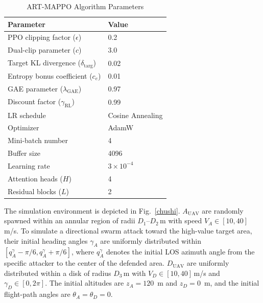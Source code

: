 \documentclass[lettersize,journal]{IEEEtran}
\newcommand{\hladd}[1]{{\color{blue}#1}}
\begin{document}
\begin{table}[t]
\centering
\renewcommand{\arraystretch}{1.4}
\caption{ART-MAPPO Algorithm Parameters}
\label{table2}
\begin{tabular}{ll}
\hline\hline
Parameter & Value \\ \hline
PPO clipping factor ($\epsilon$) & 0.2 \\
Dual-clip parameter ($c$) & 3.0 \\
Target KL divergence ($\delta_{\text{targ}}$) & 0.02 \\
Entropy bonus coefficient ($c_e$) & 0.01 \\
GAE parameter ($\lambda_{\mathrm{GAE}}$) & 0.97 \\
\hladd{Discount factor ($\gamma_{\mathrm{RL}}$)} & \hladd{0.99} \\
LR schedule & Cosine Annealing \\
Optimizer & AdamW \\
Mini-batch number & 4 \\
Buffer size & 4096 \\
Learning rate & $3\times10^{-4}$ \\
Attention heads ($H$) & 4 \\
Residual blocks ($L$) & 2 \\ \hline
\end{tabular}
\end{table}


The simulation environment is depicted in Fig.~\ref{chushi}.
$A_{\text{UAV}}$ are randomly spawned within an annular region of radii $D_1$--$D_2$\,m with speed
$V_A\in[10,40]$\,m/s. To simulate a directional swarm attack toward the high-value target area, their initial heading angles $\gamma_A$ are uniformly distributed within \hladd{$[q_A^{\gamma}-\pi/6,q_A^{\gamma}+\pi/6]$}, where \hladd{$q_A^{\gamma}$ denotes the initial LOS azimuth angle} from the specific attacker to the center of the defended area.
$D_{\text{UAV}}$ are uniformly distributed within a disk of radius $D_3$\,m with
$V_D\in[10,40]$\,m/s and $\gamma_D\in[0,2\pi]$.
\hladd{The initial altitudes are $z_A=120$~m and $z_D=0$~m, and the initial flight-path angles are $\theta_A=\theta_D=0$.}
\end{document}
